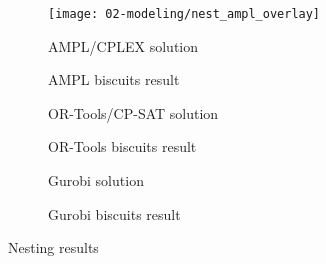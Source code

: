 \begin{figure}[p]
	\begin{subfigure}[b]{.43\textwidth}
		\centering
		\texttt{[image: 02-modeling/nest\_ampl\_overlay]}
		\caption{AMPL/CPLEX solution}
		\label{fig:ampl_nest_overlay}
	\end{subfigure} 
	\hfill
	\begin{subfigure}[b]{.43\textwidth}
		\centering
		\caption{AMPL biscuits result}
		\label{fig:ampl_nest_vis}
	\end{subfigure}

	\vfill
	
	\begin{subfigure}[b]{.43\textwidth}
		\centering
		\caption{OR-Tools/CP-SAT solution}
		\label{fig:ortools_nest_overlay}
	\end{subfigure} 
	\hfill
	\begin{subfigure}[b]{.43\textwidth}
		\centering
		\caption{OR-Tools biscuits result}
		\label{fig:ortools_nest_vis}
	\end{subfigure}

	\vfill
	
	\begin{subfigure}[b]{.43\textwidth}
		\centering
		\caption{Gurobi solution}
		\label{fig:gurobi_nest_overlay}
	\end{subfigure} 
	\hfill
	\begin{subfigure}[b]{.43\textwidth}
		\centering
		\caption{Gurobi biscuits result}
		\label{fig:gurobi_nest_vis}
	\end{subfigure}
	\caption{Nesting results}
	\label{fig:nesting_results}
\end{figure}
